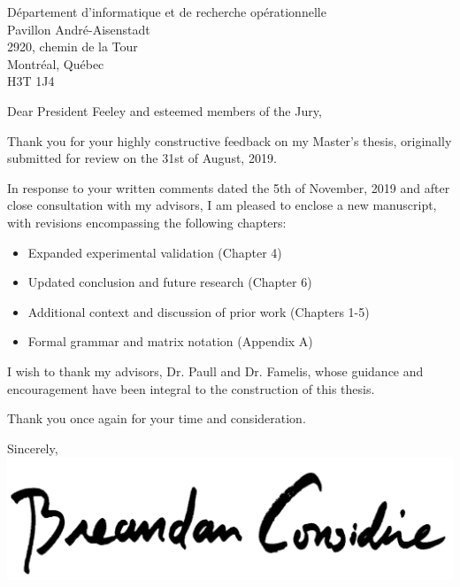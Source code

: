 \documentclass{letter}
\begin{document}
    \begin{letter}{D\'epartement d'informatique et de recherche op\'erationnelle \\ Pavillon Andr\'e-Aisenstadt \\ 2920, chemin de la Tour \\ Montr\'eal, Qu\'ebec \\ H3T 1J4}
        \opening{Dear President Feeley and esteemed members of the Jury,}
        Thank you for your highly constructive feedback on my Master's thesis, originally submitted for review on the 31st of August, 2019.

        In response to your written comments dated the 5th of November, 2019 and after close consultation with my advisors, I am pleased to enclose a new manuscript, with revisions encompassing the following chapters:

        \begin{itemize}
            \item Expanded experimental validation (Chapter 4)
            \item Updated conclusion and future research (Chapter 6)
            \item Additional context and discussion of prior work (Chapters 1-5)
            \item Formal grammar and matrix notation (Appendix A)
        \end{itemize}

        I wish to thank my advisors, Dr. Paull and Dr. Famelis, whose guidance and encouragement have been integral to the construction of this thesis.

        Thank you once again for your time and consideration.

        \closing{Sincerely,\\
            \includegraphics[scale=0.06]{signature.png}\\
        }
    \end{letter}
\end{document}
